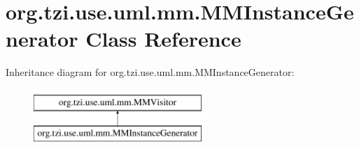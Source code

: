 \hypertarget{classorg_1_1tzi_1_1use_1_1uml_1_1mm_1_1_m_m_instance_generator}{\section{org.\-tzi.\-use.\-uml.\-mm.\-M\-M\-Instance\-Generator Class Reference}
\label{classorg_1_1tzi_1_1use_1_1uml_1_1mm_1_1_m_m_instance_generator}
}
Inheritance diagram for org.\-tzi.\-use.\-uml.\-mm.\-M\-M\-Instance\-Generator\-:\begin{figure}[H]
\begin{center}
\leavevmode
\includegraphics[height=2.000000cm]{classorg_1_1tzi_1_1use_1_1uml_1_1mm_1_1_m_m_instance_generator}
\end{center}
\end{figure}
